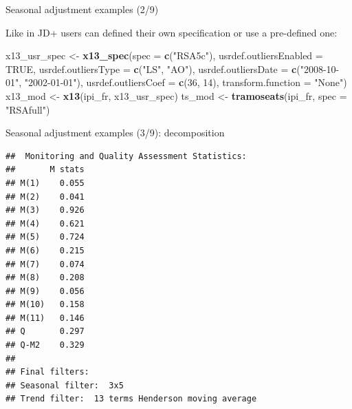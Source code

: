 \documentclass[10pt,xcolor=table,color={dvipsnames,usenames},ignorenonframetext,usepdftitle=false,french]{beamer}
\newenvironment{Shaded}{\begin{snugshade}}{\end{snugshade}}
\newcommand{\DataTypeTok}[1]{\textcolor[rgb]{0.13,0.29,0.53}{#1}}
\newcommand{\DecValTok}[1]{\textcolor[rgb]{0.00,0.00,0.81}{#1}}
\newcommand{\KeywordTok}[1]{\textcolor[rgb]{0.13,0.29,0.53}{\textbf{#1}}}
\newcommand{\NormalTok}[1]{#1}
\newcommand{\OperatorTok}[1]{\textcolor[rgb]{0.81,0.36,0.00}{\textbf{#1}}}
\newcommand{\OtherTok}[1]{\textcolor[rgb]{0.56,0.35,0.01}{#1}}
\newcommand{\StringTok}[1]{\textcolor[rgb]{0.31,0.60,0.02}{#1}}
\begin{document}
\begin{frame}[fragile]{Seasonal adjustment examples (2/9)}
\protect\hypertarget{seasonal-adjustment-examples-29}{}

Like in JD+ users can defined their own specification or use a
pre-defined one:

\footnotesize

\begin{Shaded}
\begin{Highlighting}[]
\NormalTok{x13_usr_spec <-}\StringTok{ }\KeywordTok{x13_spec}\NormalTok{(}\DataTypeTok{spec =} \KeywordTok{c}\NormalTok{(}\StringTok{"RSA5c"}\NormalTok{),}
                         \DataTypeTok{usrdef.outliersEnabled =} \OtherTok{TRUE}\NormalTok{,}
                         \DataTypeTok{usrdef.outliersType =} \KeywordTok{c}\NormalTok{(}\StringTok{"LS"}\NormalTok{, }\StringTok{"AO"}\NormalTok{),}
                         \DataTypeTok{usrdef.outliersDate =} \KeywordTok{c}\NormalTok{(}\StringTok{"2008-10-01"}\NormalTok{,}
                                                 \StringTok{"2002-01-01"}\NormalTok{),}
                         \DataTypeTok{usrdef.outliersCoef =} \KeywordTok{c}\NormalTok{(}\DecValTok{36}\NormalTok{, }\DecValTok{14}\NormalTok{),}
                         \DataTypeTok{transform.function =} \StringTok{"None"}\NormalTok{)}
\NormalTok{x13_mod <-}\StringTok{ }\KeywordTok{x13}\NormalTok{(ipi_fr, x13_usr_spec)}
\NormalTok{ts_mod <-}\StringTok{ }\KeywordTok{tramoseats}\NormalTok{(ipi_fr, }\DataTypeTok{spec =} \StringTok{"RSAfull"}\NormalTok{)}
\end{Highlighting}
\end{Shaded}

\end{frame}

\begin{frame}[fragile]{Seasonal adjustment examples (3/9):
decomposition}
\protect\hypertarget{seasonal-adjustment-examples-39-decomposition}{}

\footnotesize

\begin{Shaded}
\end{Shaded}

\begin{verbatim}
##  Monitoring and Quality Assessment Statistics:  
##       M stats
## M(1)    0.055
## M(2)    0.041
## M(3)    0.926
## M(4)    0.621
## M(5)    0.724
## M(6)    0.215
## M(7)    0.074
## M(8)    0.208
## M(9)    0.056
## M(10)   0.158
## M(11)   0.146
## Q       0.297
## Q-M2    0.329
## 
## Final filters: 
## Seasonal filter:  3x5
## Trend filter:  13 terms Henderson moving average
\end{verbatim}

\end{frame}
\end{document}
